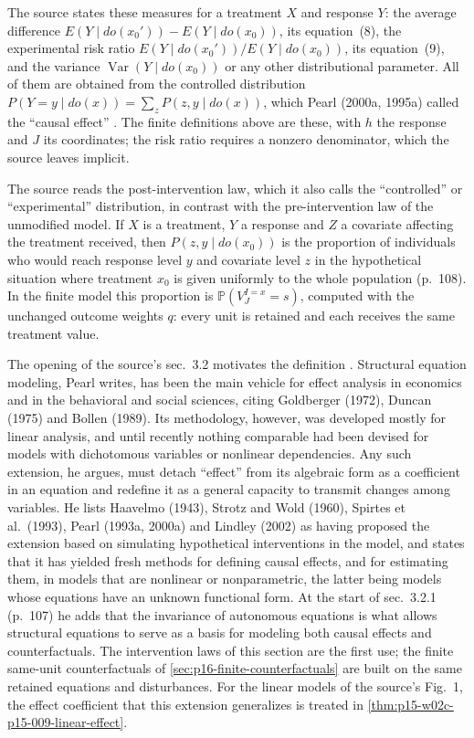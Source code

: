 The source states these measures for a treatment \(X\) and response
\(Y\): the average difference
\(E(Y\mid do(x_0'))-E(Y\mid do(x_0))\), its equation~(8), the
experimental risk ratio \(E(Y\mid do(x_0'))/E(Y\mid do(x_0))\), its
equation~(9), and the variance \(\operatorname{Var}(Y\mid do(x_0))\) or
any other distributional parameter. All of them are obtained from the
controlled distribution
\(P(Y=y\mid do(x))=\sum_zP(z,y\mid do(x))\), which Pearl (2000a, 1995a)
called the ``causal effect''
\cite[sec.~3.2.1, p.~108]{Pearl2009CausalOverview}. The finite
definitions above are these, with \(h\) the response and \(J\) its
coordinates; the risk ratio requires a nonzero denominator, which the
source leaves implicit.

The source reads the post-intervention law, which it also calls the
``controlled'' or ``experimental'' distribution, in contrast with the
pre-intervention law of the unmodified model. If \(X\) is a treatment,
\(Y\) a response and \(Z\) a covariate affecting the treatment received,
then \(P(z,y\mid do(x_0))\) is the proportion of individuals who would
reach response level \(y\) and covariate level \(z\) in the hypothetical
situation where treatment \(x_0\) is given uniformly to the whole
population (p.~108). In the finite model this proportion is
\(\mathbb P(V^{I=x}_J=s)\), computed with the unchanged outcome weights
\(q\): every unit is retained and each receives the same treatment value.

The opening of the source's sec.~3.2 motivates the definition
\cite[sec.~3.2, p.~107]{Pearl2009CausalOverview}. Structural equation
modeling, Pearl writes, has been the main vehicle for effect analysis in
economics and in the behavioral and social sciences, citing Goldberger
(1972), Duncan (1975) and Bollen (1989). Its methodology, however, was
developed mostly for linear analysis, and until recently nothing
comparable had been devised for models with dichotomous variables or
nonlinear dependencies. Any such extension, he argues, must detach
``effect'' from its algebraic form as a coefficient in an equation and
redefine it as a general capacity to transmit changes among variables.
He lists Haavelmo (1943), Strotz and Wold (1960), Spirtes et al.\ (1993),
Pearl (1993a, 2000a) and Lindley (2002) as having proposed the extension
based on simulating hypothetical interventions in the model, and states
that it has yielded fresh methods for defining causal effects, and for
estimating them, in models that are nonlinear or nonparametric, the latter being models whose
equations have an unknown functional form. At the start of sec.~3.2.1
(p.~107) he adds that the invariance of autonomous equations is what
allows structural equations to serve as a basis for modeling both causal
effects and counterfactuals. The intervention laws of this section are the
first use; the finite same-unit counterfactuals of
\cref{sec:p16-finite-counterfactuals} are built on the same retained
equations and disturbances. For the linear models of the source's
Fig.~1, the effect coefficient that this extension generalizes is treated
in \cref{thm:p15-w02c-p15-009-linear-effect}.

